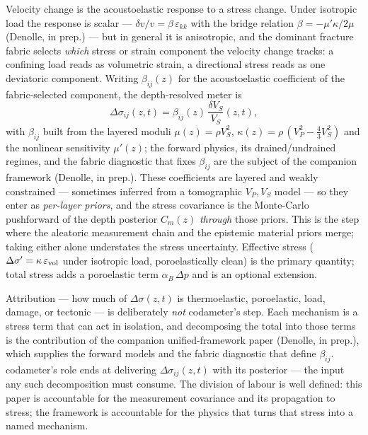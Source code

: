\documentclass[
  referee]{gji}
\begin{document}
Velocity change is the acoustoelastic response to a stress change. Under
isotropic load the response is scalar ---
\(\delta v/v = \beta\,\varepsilon_{kk}\) with the bridge relation
\(\beta=-\mu'\kappa/2\mu\) (Denolle, in prep.) --- but in general it is
anisotropic, and the dominant fracture fabric selects \emph{which}
stress or strain component the velocity change tracks: a confining load
reads as volumetric strain, a directional stress reads as one deviatoric
component. Writing \(\beta_{ij}(z)\) for the acoustoelastic coefficient
of the fabric-selected component, the depth-resolved meter is
\begin{equation}
\Delta\sigma_{ij}(z,t) = \beta_{ij}(z)\,\frac{\delta V_S}{V_S}(z,t),
\label{eq:acoustoelastic}
\end{equation} with \(\beta_{ij}\) built from the layered moduli
\(\mu(z)=\rho V_S^2\), \(\kappa(z)=\rho\,(V_P^2-\tfrac43 V_S^2)\) and
the nonlinear sensitivity \(\mu'(z)\); the forward physics, its
drained/undrained regimes, and the fabric diagnostic that fixes
\(\beta_{ij}\) are the subject of the companion framework (Denolle, in
prep.). These coefficients are layered and weakly constrained ---
sometimes inferred from a tomographic \(V_P,V_S\) model --- so they
enter as \emph{per-layer priors}, and the stress covariance is the
Monte-Carlo pushforward of the depth posterior \(C_m(z)\) \emph{through}
those priors. This is the step where the aleatoric measurement chain and
the epistemic material priors merge; taking either alone understates the
stress uncertainty. Effective stress
(\(\Delta\sigma'=\kappa\,\varepsilon_{\rm vol}\) under isotropic load,
poroelastically clean) is the primary quantity; total stress adds a
poroelastic term \(\alpha_B\,\Delta p\) and is an optional extension.

Attribution --- how much of \(\Delta\sigma(z,t)\) is thermoelastic,
poroelastic, load, damage, or tectonic --- is deliberately \emph{not}
codameter's step. Each mechanism is a stress term that can act in
isolation, and decomposing the total into those terms is the
contribution of the companion unified-framework paper (Denolle, in
prep.), which supplies the forward models and the fabric diagnostic that
define \(\beta_{ij}\). codameter's role ends at delivering
\(\Delta\sigma_{ij}(z,t)\) with its posterior --- the input any such
decomposition must consume. The division of labour is well defined: this
paper is accountable for the measurement covariance and its propagation
to stress; the framework is accountable for the physics that turns that
stress into a named mechanism.
\end{document}
